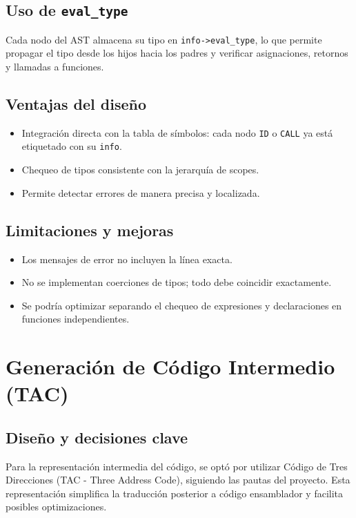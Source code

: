 \documentclass[12pt,a4paper]{article}
\begin{document}
\subsection{Uso de \texttt{eval\_type}}
Cada nodo del AST almacena su tipo en \texttt{info->eval\_type}, lo que permite propagar el tipo desde los hijos hacia los padres y verificar asignaciones, retornos y llamadas a funciones.

\subsection{Ventajas del diseño}
\begin{itemize}
    \item Integración directa con la tabla de símbolos: cada nodo \texttt{ID} o \texttt{CALL} ya está etiquetado con su \texttt{info}.
    \item Chequeo de tipos consistente con la jerarquía de scopes.
    \item Permite detectar errores de manera precisa y localizada.
\end{itemize}

\subsection{Limitaciones y mejoras}
\begin{itemize}
    \item Los mensajes de error no incluyen la línea exacta.
    \item No se implementan coerciones de tipos; todo debe coincidir exactamente.
    \item Se podría optimizar separando el chequeo de expresiones y declaraciones en funciones independientes.
\end{itemize}

\section{Generación de Código Intermedio (TAC)}

\subsection{Diseño y decisiones clave}
Para la representación intermedia del código, se optó por utilizar Código de Tres Direcciones (TAC - Three Address Code), siguiendo las pautas del proyecto. Esta representación simplifica la traducción posterior a código ensamblador y facilita posibles optimizaciones.
\end{document}
